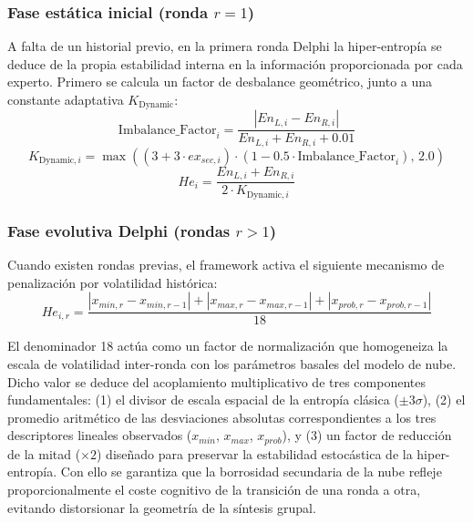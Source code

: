 \documentclass[11pt,a4paper]{article}
\begin{document}
\subsubsection{Fase estática inicial (ronda $r = 1$)}
A falta de un historial previo, en la primera ronda Delphi la hiper-entropía se deduce de la propia estabilidad interna en la información proporcionada por cada experto. Primero se calcula un factor de desbalance geométrico, junto a una constante adaptativa $K_{\text{Dynamic}}$:
\begin{equation}
    \text{Imbalance\_Factor}_i = \frac{|En_{L,i} - En_{R,i}|}{En_{L,i} + En_{R,i} + 0.01}
\end{equation}
\begin{equation}
    K_{\text{Dynamic},i} = \max\left((3 + 3 \cdot ex_{sec,i}) \cdot (1 - 0.5 \cdot \text{Imbalance\_Factor}_i),\, 2.0\right)
\end{equation}
\begin{equation}
    He_{i} = \frac{En_{L,i} + En_{R,i}}{2 \cdot K_{\text{Dynamic},i}}
\end{equation}

\subsubsection{Fase evolutiva Delphi (rondas $r > 1$)}
Cuando existen rondas previas, el framework activa el siguiente mecanismo de penalización por volatilidad histórica:
\begin{equation}
    He_{i,r} = \frac{|x_{min,r} - x_{min,r-1}| + |x_{max,r} - x_{max,r-1}| + |x_{prob,r} - x_{prob,r-1}|}{18}
\end{equation}

El denominador 18 actúa como un factor de normalización que homogeneiza la escala de volatilidad inter-ronda con los parámetros basales del modelo de nube. Dicho valor se deduce del acoplamiento multiplicativo de tres componentes fundamentales: (1) el divisor de escala espacial de la entropía clásica ($\pm3\sigma$), (2) el promedio aritmético de las desviaciones absolutas correspondientes a los tres descriptores lineales observados ($x_{min}$, $x_{max}$, $x_{prob}$), y (3) un factor de reducción de la mitad ($\times 2$) diseñado para preservar la estabilidad estocástica de la hiper-entropía. Con ello se garantiza que la borrosidad secundaria de la nube refleje proporcionalmente el coste cognitivo de la transición de una ronda a otra, evitando distorsionar la geometría de la síntesis grupal.
\end{document}
